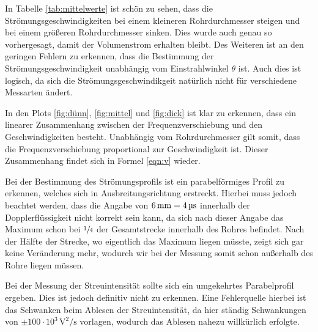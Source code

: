 In Tabelle \ref{tab:mittelwerte} ist schön zu sehen, dass die Strömungsgeschwindigkeiten bei einem kleineren Rohrdurchmesser steigen und bei einem größeren Rohrdurchmesser sinken. Dies wurde auch genau so vorhergesagt, damit der Volumenstrom erhalten bleibt. Des Weiteren ist
an den geringen Fehlern zu erkennen, dass die Bestimmung der Strömungsgeschwindigkeit unabhängig vom Einstrahlwinkel $\theta$ ist.
Auch dies ist logisch, da sich die Strömungsgeschwindikgeit natürlich nicht für verschiedene Messarten ändert.

In den Plots \ref{fig:dünn}, \ref{fig:mittel} und \ref{fig:dick} ist klar zu erkennen, dass ein linearer Zusammenhang zwischen der Frequenzverschiebung und den Geschwindigkeiten besteht.
Unabhängig vom Rohrdurchmesser gilt somit, dass die Frequenzverschiebung proportional zur Geschwindigkeit ist. Dieser Zusammenhang findet sich in Formel \eqref{eqn:v} wieder.

Bei der Bestimmung des Strömungsprofils ist ein parabelförmiges Profil zu erkennen, welches sich in Ausbreitungsrichtung erstreckt. Hierbei muss jedoch beachtet werden, dass die Angabe von $6\,\si{\milli\meter} = 4\,\si{\micro\second}$ innerhalb der
Dopplerflüssigkeit nicht korrekt sein kann, da sich nach dieser Angabe das Maximum schon bei $\sfrac{1}{4}$ der Gesamtstrecke innerhalb des Rohres befindet. Nach der Hälfte der Strecke, wo eigentlich das Maximum liegen müsste, zeigt sich gar keine Veränderung mehr, wodurch wir bei der
Messung somit schon außerhalb des Rohre liegen müssen.

Bei der Messung der Streuintensität sollte sich ein umgekehrtes Parabelprofil ergeben. Dies ist jedoch definitiv nicht zu erkennen.
Eine Fehlerquelle hierbei ist das Schwanken beim Ablesen der Streuintensität, da hier ständig Schwankungen von $\pm 100\cdot 10^3\,
\si{\square\volt\per\second}$ vorlagen, wodurch das Ablesen nahezu
willkürlich erfolgte.
